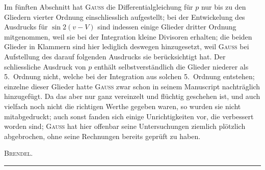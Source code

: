 \par\noindent\hspace*{\parindent}Im fünften Abschnitt hat \textsc{Gauss} die Differentialgleichung für \(p\) nur bis zu den Gliedern vierter Ordnung
einschliesslich aufgestellt; bei der Entwickelung des Ausdrucks für \(\sin 2(v-V)\) sind indessen einige
Glieder dritter Ordnung mitgenommen, weil sie bei der Integration kleine Divisoren erhalten; die beiden
Glieder in Klammern sind hier lediglich deswegen hinzugesetzt, weil \textsc{Gauss} bei Aufstellung des darauf
folgenden Ausdrucks sie berücksichtigt hat. Der schliessliche Ausdruck von \(p\) enthält selbstverständlich
die Glieder niederer als 5.~Ordnung nicht, welche bei der Integration aus solchen 5.~Ordnung entstehen;
einzelne dieser Glieder hatte \textsc{Gauss} zwar schon in seinem Manuscript nachträglich hinzugefügt. Da
das aber nur ganz vereinzelt und flüchtig geschehen ist, und auch vielfach noch nicht die richtigen Werthe
gegeben waren, so wurden sie nicht mitabgedruckt; auch sonst fanden sich einige Unrichtigkeiten vor,
die verbessert worden sind; \textsc{Gauss} hat hier offenbar seine Untersuchungen ziemlich plötzlich abgebrochen,
ohne seine Rechnungen bereits geprüft zu haben.
\begin{flushright}\textsc{Brendel}.\end{flushright}
\par\begin{center}\rule{.24\linewidth}{.4pt}\end{center}
\clearpage
\endgroup
